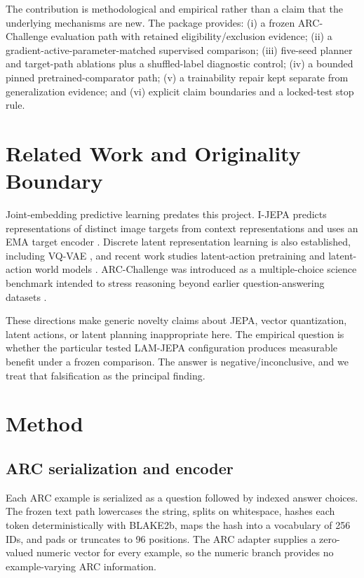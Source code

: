 \documentclass[conference]{IEEEtran}
\begin{document}
The contribution is methodological and empirical rather than a claim that the underlying mechanisms are new. The package provides: (i) a frozen ARC-Challenge evaluation path with retained eligibility/exclusion evidence; (ii) a gradient-active-parameter-matched supervised comparison; (iii) five-seed planner and target-path ablations plus a shuffled-label diagnostic control; (iv) a bounded pinned pretrained-comparator path; (v) a trainability repair kept separate from generalization evidence; and (vi) explicit claim boundaries and a locked-test stop rule.

\section{Related Work and Originality Boundary}
Joint-embedding predictive learning predates this project. I-JEPA predicts representations of distinct image targets from context representations and uses an EMA target encoder \cite{ijepa}. Discrete latent representation learning is also established, including VQ-VAE \cite{vqvae}, and recent work studies latent-action pretraining and latent-action world models \cite{lapa,latentworld}. ARC-Challenge was introduced as a multiple-choice science benchmark intended to stress reasoning beyond earlier question-answering datasets \cite{arc}.

These directions make generic novelty claims about JEPA, vector quantization, latent actions, or latent planning inappropriate here. The empirical question is whether the particular tested LAM-JEPA configuration produces measurable benefit under a frozen comparison. The answer is negative/inconclusive, and we treat that falsification as the principal finding.

\section{Method}
\subsection{ARC serialization and encoder}
Each ARC example is serialized as a question followed by indexed answer choices. The frozen text path lowercases the string, splits on whitespace, hashes each token deterministically with BLAKE2b, maps the hash into a vocabulary of 256 IDs, and pads or truncates to 96 positions. The ARC adapter supplies a zero-valued numeric vector for every example, so the numeric branch provides no example-varying ARC information.
\end{document}
